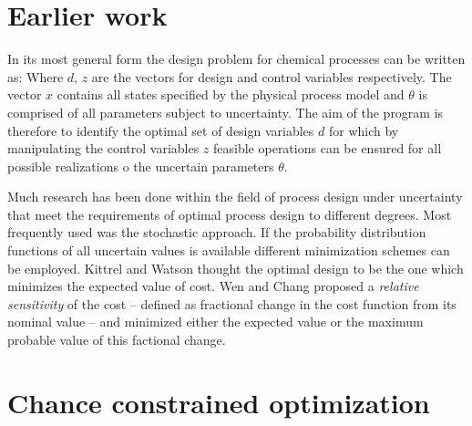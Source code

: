 \section{Earlier work}
\label{sec:des:EarlierWork}
In its most general form the design problem for chemical processes can be written as:
Where $d$, $z$ are the vectors for design and control variables respectively. The vector $x$ contains
all states specified by the physical process model and $\theta$ is comprised of all parameters subject
to uncertainty. The aim of the program is therefore to identify the optimal set of design variables $d$
for which by manipulating the control variables $z$ feasible operations can be ensured for all possible 
realizations o the uncertain parameters $\theta$. 

Much research has been done within the field of process design under uncertainty that meet the 
requirements of optimal process design to different degrees. Most frequently used was the stochastic 
approach. If the probability distribution functions of all uncertain values is available different minimization 
schemes can be employed. Kittrel and Watson \cite{} 
thought the optimal design to be the one which minimizes the expected value of cost. Wen and Chang 
\cite{}  proposed a \emph{relative sensitivity} of the cost -- 
defined as fractional change in the cost function from its nominal value -- and minimized either the expected 
value or the maximum probable value of this factional change. 

\section{Chance constrained optimization}
\label{sec:des:ChanceConstrained}

















